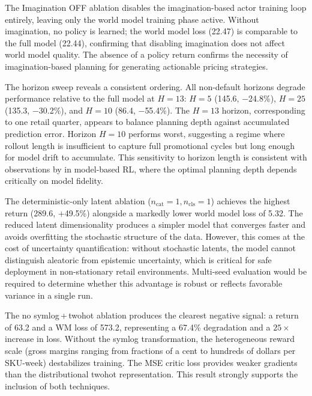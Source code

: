 The Imagination OFF ablation disables the imagination-based actor training loop entirely, leaving only the world model training phase active. Without imagination, no policy is learned; the world model loss (22.47) is comparable to the full model (22.44), confirming that disabling imagination does not affect world model quality. The absence of a policy return confirms the necessity of imagination-based planning for generating actionable pricing strategies.

The horizon sweep reveals a consistent ordering. All non-default horizons degrade performance relative to the full model at $H{=}13$: $H{=}5$ (145.6, $-$24.8\%), $H{=}25$ (135.3, $-$30.2\%), and $H{=}10$ (86.4, $-$55.4\%). The $H{=}13$ horizon, corresponding to one retail quarter, appears to balance planning depth against accumulated prediction error. Horizon $H{=}10$ performs worst, suggesting a regime where rollout length is insufficient to capture full promotional cycles but long enough for model drift to accumulate. This sensitivity to horizon length is consistent with observations by \citet{janner2019trust} in model-based RL, where the optimal planning depth depends critically on model fidelity.

The deterministic-only latent ablation ($n_\text{cat} = 1, n_\text{cls} = 1$) achieves the highest return (289.6, $+$49.5\%) alongside a markedly lower world model loss of 5.32. The reduced latent dimensionality produces a simpler model that converges faster and avoids overfitting the stochastic structure of the data. However, this comes at the cost of uncertainty quantification: without stochastic latents, the model cannot distinguish aleatoric from epistemic uncertainty, which is critical for safe deployment in non-stationary retail environments. Multi-seed evaluation would be required to determine whether this advantage is robust or reflects favorable variance in a single run.

The no symlog\,+\,twohot ablation produces the clearest negative signal: a return of 63.2 and a WM loss of 573.2, representing a 67.4\% degradation and a $25{\times}$ increase in loss. Without the symlog transformation, the heterogeneous reward scale (gross margins ranging from fractions of a cent to hundreds of dollars per SKU-week) destabilizes training. The MSE critic loss provides weaker gradients than the distributional twohot representation. This result strongly supports the inclusion of both techniques.

